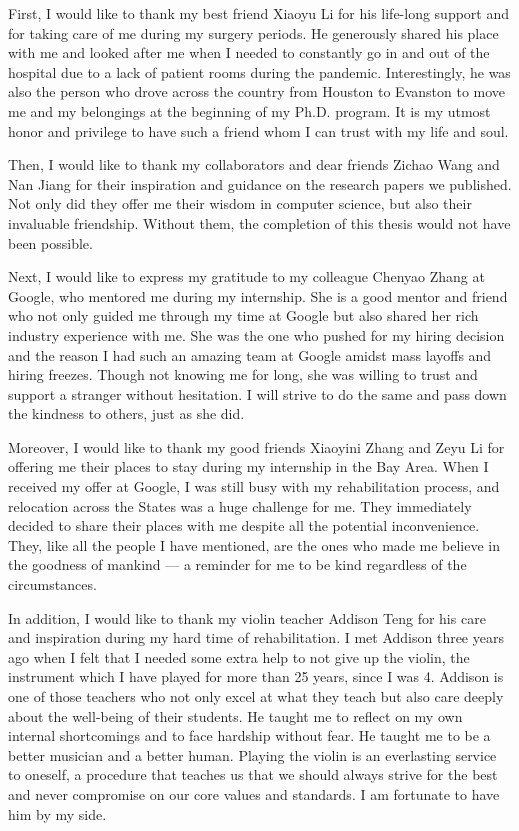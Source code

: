 First, I would like to thank my best friend Xiaoyu Li for his life-long support and for taking care of me during my surgery periods. He generously shared his place with me and looked after me when I needed to constantly go in and out of the hospital due to a lack of patient rooms during the pandemic. Interestingly, he was also the person who drove across the country from Houston to Evanston to move me and my belongings at the beginning of my Ph.D. program. It is my utmost honor and privilege to have such a friend whom I can trust with my life and soul.

Then, I would like to thank my collaborators and dear friends Zichao Wang and Nan Jiang for their inspiration and guidance on the research papers we published. Not only did they offer me their wisdom in computer science, but also their invaluable friendship. Without them, the completion of this thesis would not have been possible.

Next, I would like to express my gratitude to my colleague Chenyao Zhang at Google, who mentored me during my internship. She is a good mentor and friend who not only guided me through my time at Google but also shared her rich industry experience with me. She was the one who pushed for my hiring decision and the reason I had such an amazing team at Google amidst mass layoffs and hiring freezes. Though not knowing me for long, she was willing to trust and support a stranger without hesitation. I will strive to do the same and pass down the kindness to others, just as she did.

Moreover, I would like to thank my good friends Xiaoyini Zhang and Zeyu Li for offering me their places to stay during my internship in the Bay Area. When I received my offer at Google, I was still busy with my rehabilitation process, and relocation across the States was a huge challenge for me. They immediately decided to share their places with me despite all the potential inconvenience. They, like all the people I have mentioned, are the ones who made me believe in the goodness of mankind — a reminder for me to be kind regardless of the circumstances.

In addition, I would like to thank my violin teacher Addison Teng for his care and inspiration during my hard time of rehabilitation. I met Addison three years ago when I felt that I needed some extra help to not give up the violin, the instrument which I have played for more than 25 years, since I was 4. Addison is one of those teachers who not only excel at what they teach but also care deeply about the well-being of their students. He taught me to reflect on my own internal shortcomings and to face hardship without fear. He taught me to be a better musician and a better human. Playing the violin is an everlasting service to oneself, a procedure that teaches us that we should always strive for the best and never compromise on our core values and standards. I am fortunate to have him by my side.

